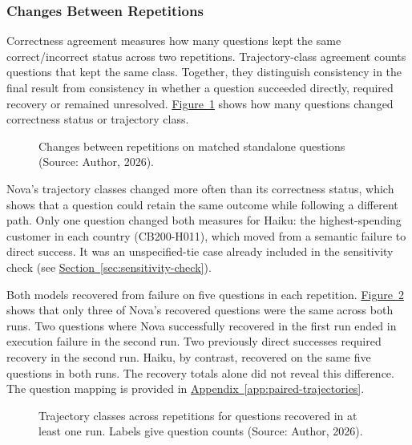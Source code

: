 \subsubsection{Changes Between Repetitions}

Correctness agreement measures how many questions kept the same
correct/incorrect status across two repetitions. 
Trajectory-class agreement counts questions that kept the same class.
Together, they distinguish consistency in the final result from consistency
in whether a question succeeded directly, required recovery or remained unresolved.
\hyperref[fig:results-stability]{Figure~\ref*{fig:results-stability}}
shows how many questions changed correctness status or trajectory class.

\begin{figure}[H]
\centering

\caption{Changes between repetitions on matched standalone questions (Source: Author, 2026).}
\label{fig:results-stability}
\end{figure}

Nova's trajectory classes changed more often than its correctness status,
which shows that a question could retain the same outcome while following a different path.
Only one question changed both measures for Haiku: 
the highest-spending customer in each country (CB200-H011), 
which moved from a semantic failure to direct success.
It was an unspecified-tie case already included in the sensitivity check
(see \hyperref[sec:sensitivity-check]{Section~\ref*{sec:sensitivity-check}}).

Both models recovered from failure on five questions in each repetition.
\hyperref[fig:results-recovery-stability]{Figure~\ref*{fig:results-recovery-stability}}
shows that only three of Nova's recovered
questions were the same across both runs.
Two questions where Nova successfully recovered in the first
run ended in execution failure in the second run.
Two previously direct successes required recovery in the second run.
Haiku, by contrast, recovered on the same five questions in both runs.
The recovery totals alone did not reveal this difference.
The question mapping is provided in
\hyperref[app:paired-trajectories]{Appendix~\ref*{app:paired-trajectories}}.

\begin{figure}[H]
\centering

\caption{Trajectory classes across repetitions for questions recovered in at least
one run. Labels give question counts (Source: Author, 2026).}
\label{fig:results-recovery-stability}
\end{figure}

